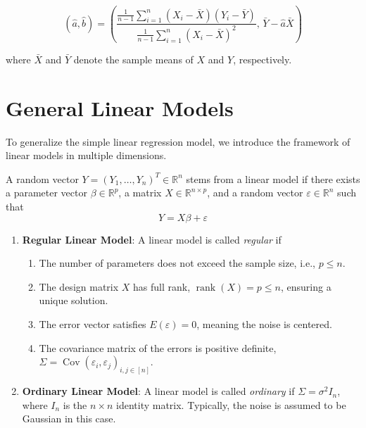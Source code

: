 \documentclass[open=any, 11pt,paper=A4]{scrreprt}
\begin{document}
\[
(\hat{a}, \hat{b}) = \left( \frac{\frac{1}{n-1} \sum_{i=1}^{n} (X_i - \bar{X})(Y_i - \bar{Y})}{\frac{1}{n-1} \sum_{i=1}^{n} (X_i - \bar{X})^2}, \, \bar{Y} - \hat{a} \bar{X} \right)
\]

where \( \bar{X} \) and \( \bar{Y} \) denote the sample means of \( X \) and \( Y \), respectively.

\section{General Linear Models}

To generalize the simple linear regression model, we introduce the framework of linear models in multiple dimensions.

\begin{definition}
    A random vector \( Y = (Y_1, \ldots, Y_n)^T \in \mathbb{R}^n \) stems from a linear model if there exists a parameter vector \( \beta \in \mathbb{R}^p \), a matrix \( X \in \mathbb{R}^{n \times p} \), and a random vector \( \varepsilon \in \mathbb{R}^n \) such that
    \[
    Y = X \beta + \varepsilon
    \]
    \begin{enumerate}
        \item \textbf{Regular Linear Model}: A linear model is called \emph{regular} if
        \begin{enumerate}
            \item The number of parameters does not exceed the sample size, i.e., \( p \le n \).
            \item The design matrix \( X \) has full rank, \( \operatorname{rank}(X) = p \le n \), ensuring a unique solution.
            \item The error vector satisfies \( E(\varepsilon) = 0 \), meaning the noise is centered.
            \item The covariance matrix of the errors is positive definite, \( \Sigma = \operatorname{Cov}(\varepsilon_i, \varepsilon_j)_{i,j \in [n]} \).
        \end{enumerate}
        \item \textbf{Ordinary Linear Model}: A linear model is called \emph{ordinary} if \( \Sigma = \sigma^2 I_n \), where \( I_n \) is the \( n \times n \) identity matrix. Typically, the noise is assumed to be Gaussian in this case.
    \end{enumerate}
\end{definition}
\end{document}
